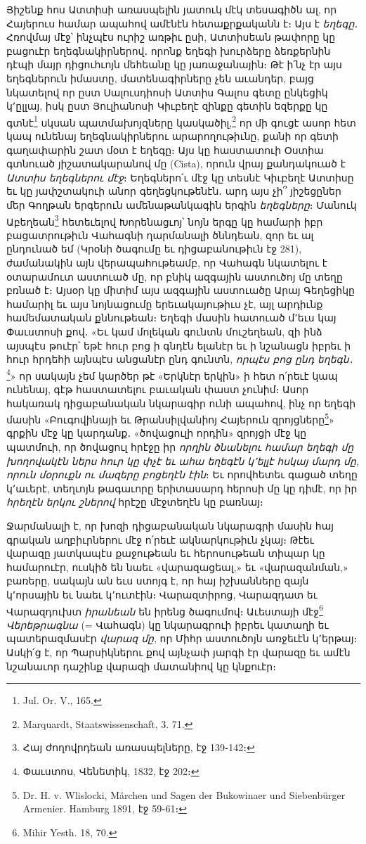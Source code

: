 \documentclass{article}
\begin{document}
{Յիշենք հոս Ատտիսի առասպելին յատուկ մէկ տեսագիծն ալ, որ Հայերուս համար ապահով ամէնէն հետաքրքականն է։ Այս է \emph{եղեգը․} Հռովմայ մէջ՝ ինչպէս ուրիշ առթիւ ըսի, Ատտիսեան թափորը կը բացուէր եղեգնակիրներով․ որոնք եղեգի խուրձերը ձեռքերնին դէպի մայր դիցուհւոյն մեհեանը կը յառաջանային։ Թէ ի՛նչ էր այս եղեգներուն իմաստը, մատենագիրները չեն աւանդեր, բայց նկատելով որ ըստ Սալուսդիոսի Ատտիս Գալոս գետը ընկեցիկ կ՚ըլլայ, իսկ ըստ Յուլիանոսի Կիւբեղէ զինքը գետին եզերքը կը գտնէ\footnote{Jul. Or. V., 165.} սկսան պատմախոյզները կասկածիլ,\footnote{Marquardt, Staatswissenschaft, 3. 71.} որ մի գուցէ ասոր հետ կապ ունենայ եղեգնակիրներու արարողութիւնը, քանի որ գետի գաղափարին շատ մօտ է եղեգը։ Այս կը հաստատուի Օստիա գտնուած յիշատակարանով մը (Cista), որուն վրայ քանդակուած է \emph{Ատտիս եղեգներու մէջ}։ Եղեգներո՛ւ մէջ կը տեսնէ Կիւբեղէ Ատտիսը եւ կը յափշտակուի անոր գեղեցկութենէն․ արդ այս չի՞ յիշեցըներ մեր Գողթան երգերուն ամենաթանկագին երգին \emph{եղեգները}։ Մանուկ Աբեղեան\footnote{Հայ ժողովրդեան առասպելները, էջ 139֊142։} հետեւելով Խորենացւոյ՝ նոյն երգը կը համարի իբր բացատրութիւն Վահագնի ղարմանալի ծննդեան, զոր եւ ալ ընդունած եմ (Կրօնի ծագումը եւ դիցաբանութիւն էջ 281), ժամանակին այն վերապահութեամբ, որ Վահագն նկատելու է օտարամուտ աստուած մը, որ բնիկ ազգային աստուծոյ մը տեղը բռնած է։ Այսօր կը միտիմ այս ազգային աստուածը Արայ Գեղեցիկը համարիլ եւ այս նոյնացումը երեւակայութիւս չէ, այլ արդիւնք համեմատական քննութեան։ Եղեգի մասին հատուած մ՚եւս կայ Փաւստոսի քով․ «Եւ կամ մոլեկան գունտն մուշեղեան, զի ինձ այսպէս թուէր՝ եթէ հուր բոց ի գնդէն ելանէր եւ ի նշանացն իբրեւ ի հուր հրդեհի այնպէս անցանէր ընդ գունտն, \emph{որպէս բոց ընդ եղեգն}․\footnote{Փաւստոս, Վենետիկ, 1832, էջ 202։}» որ սակայն չեմ կարծեր թէ «Երկնէր երկին» ի հետ ո՛րեւէ կապ ունենայ, գէթ հաստատելու բաւական փաստ չունիմ։ Ասոր հակառակ դիցաբանական նկարագիր ունի ապահով, ինչ որ եղեգի մասին «Բուգովինայի եւ Թրանսիլվանիոյ Հայերուն զրոյցները\footnote{Dr. H. v. Wlislocki, Märchen und Sagen der Bukowinaer und Siebenbürger Armenier. Hamburg 1891, էջ 59֊61։}» գրքին մէջ կը կարդանք․ «ծովացուլի որդին» զրոյցի մէջ կը պատմուի, որ ծովացուլ հրէջը իր \emph{որղին ծնանելու համար եղեգի մը խողովակէն ներս հուր կը փչէ եւ ահա եղեգէն կ՚ելլէ հսկայ մարդ մը, որուն մօրուքն ու մազերը բոցեղէն էին}։ Եւ որովհետեւ գացած տեղը կ՚աւերէ, տեղւոյն թագաւորը երիտասարդ հերոսի մը կը դիմէ, որ իր \emph{հրեղէն երկու շներով} հրէշը մէջտեղէն կը բառնայ։

Ջարմանալի է, որ խոզի դիցաբանական նկարագրի մասին հայ գրական աղբիւրներու մէջ ո՛րեւէ ակնարկութիւն չկայ։ Թէեւ վարազը յատկապէս քաջութեան եւ հերոսութեան տիպար կը համարուէր, ուսկիծ են նաեւ «վարազացեալ,» եւ «վարազանման,» բառերը, սակայն ան եւս ստոյգ է, որ հայ իշխանները զայն կ՚որսային եւ նաեւ կ՚ուտէին։ Վարազտիրոց, Վարազդատ եւ Վարազդուխտ \emph{իրանեան} են իրենց ծագումով։ Աւեստայի մէջ\footnote{Mihir Yesth. 18, 70.} \emph{Վերեթրագնա} (= Վահագն) կը նկարագրուի իբրեւ կատաղի եւ պատերազմասէր \emph{վարազ մը}, որ Միհր աստուծոյն առջեւէն կ՚երթայ։ Ասկի՛ց է, որ Պարսիկներու քով այնչափ յարգի էր վարազը եւ ամէն նշանաւոր դաշինք վարազի մատանիով կը կնքուէր։

}
\end{document}
